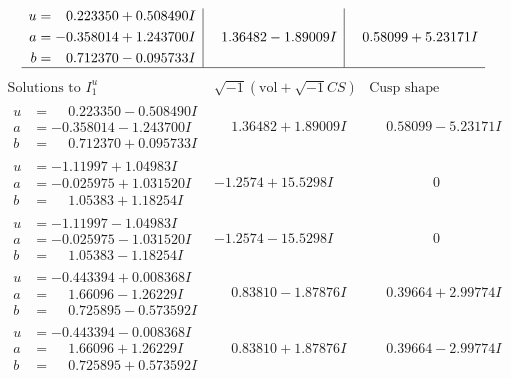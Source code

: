 \documentclass[1p]{elsarticle_modified}
\theoremstyle{definition}
\newcommand{\I}{\sqrt{-1}}
\begin{document}
$$\begin{array}{c|c|c}
\begin{aligned}
u &= \phantom{-}0.223350 + 0.508490 I \\
a &= -0.358014 + 1.243700 I \\
b &= \phantom{-}0.712370 - 0.095733 I\end{aligned}
 & \phantom{-}1.36482 - 1.89009 I & \phantom{-}0.58099 + 5.23171 I\\
 \hline 
 \end{array}$$\newpage$$\begin{array}{c|c|c}  
\text{Solutions to }I^u_{1}& \I (\text{vol} + \sqrt{-1}CS) & \text{Cusp shape}\\
 \hline 
\begin{aligned}
u &= \phantom{-}0.223350 - 0.508490 I \\
a &= -0.358014 - 1.243700 I \\
b &= \phantom{-}0.712370 + 0.095733 I\end{aligned}
 & \phantom{-}1.36482 + 1.89009 I & \phantom{-}0.58099 - 5.23171 I \\ \hline\begin{aligned}
u &= -1.11997 + 1.04983 I \\
a &= -0.025975 + 1.031520 I \\
b &= \phantom{-}1.05383 + 1.18254 I\end{aligned}
 & -1.2574 + 15.5298 I & \phantom{-0.000000 } 0 \\ \hline\begin{aligned}
u &= -1.11997 - 1.04983 I \\
a &= -0.025975 - 1.031520 I \\
b &= \phantom{-}1.05383 - 1.18254 I\end{aligned}
 & -1.2574 - 15.5298 I & \phantom{-0.000000 } 0 \\ \hline\begin{aligned}
u &= -0.443394 + 0.008368 I \\
a &= \phantom{-}1.66096 - 1.26229 I \\
b &= \phantom{-}0.725895 - 0.573592 I\end{aligned}
 & \phantom{-}0.83810 - 1.87876 I & \phantom{-}0.39664 + 2.99774 I \\ \hline\begin{aligned}
u &= -0.443394 - 0.008368 I \\
a &= \phantom{-}1.66096 + 1.26229 I \\
b &= \phantom{-}0.725895 + 0.573592 I\end{aligned}
 & \phantom{-}0.83810 + 1.87876 I & \phantom{-}0.39664 - 2.99774 I \\ \hline\begin{aligned}

\end{aligned}
\end{array}$$
\end{document}
